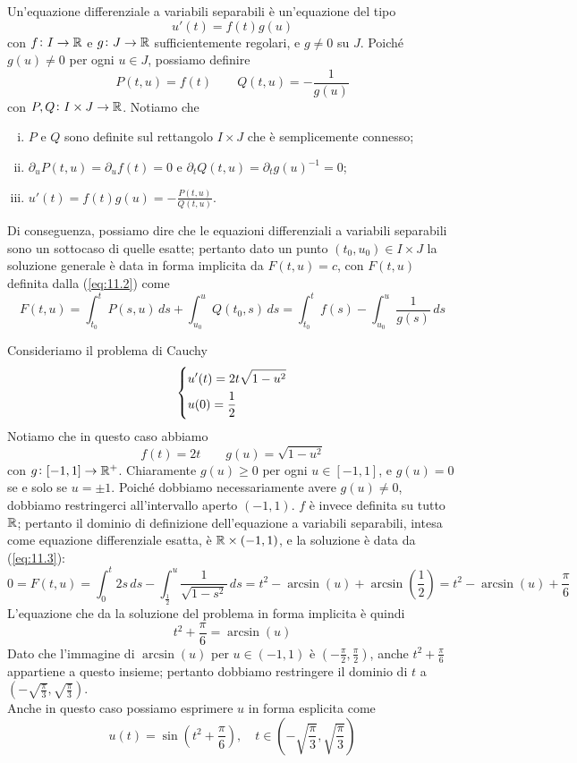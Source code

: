 \begin{definition}
    \label{def:11.6}
    Un'equazione differenziale a variabili separabili è un'equazione del tipo 
    \[
    u'(t) = f(t)g(u)
    \]
    con $f\colon I\to \amsbb{R}$ e $g\colon J \to \amsbb{R}$ sufficientemente regolari, e $g\ne 0$ su $J$. Poiché $g(u)\ne 0$ per ogni $u\in J$, possiamo definire
    \[
    P(t,u) = f(t) \qquad Q(t,u) = -\frac{1}{g(u)}
    \]
    con $P, Q \colon I \times J \to \amsbb{R}$. Notiamo che
    \begin{enumerate}[(i)]
        \item $P$ e $Q$ sono definite sul rettangolo $I \times J$ che è semplicemente connesso;
        \item $\partial_u P(t,u) = \partial_u f(t) = 0$ e $\partial_t Q(t,u) = \partial_t g(u)^{-1}=0$;
        \item $u'(t) = f(t)g(u) = -\frac{P(t,u)}{Q(t,u)}$.
    \end{enumerate}
    Di conseguenza, possiamo dire che le equazioni differenziali a variabili separabili sono un sottocaso di quelle esatte; pertanto dato un punto $(t_0, u_0)\in I\times J$ la soluzione generale è data in forma implicita da $F(t,u)=c$, con $F(t,u)$ definita dalla (\ref{eq:11.2}) come
    \begin{equation}
        \label{eq:11.3}
        F(t,u) = \int_{t_0}^t P(s,u)\, ds + \int_{u_0}^u Q(t_0, s)\, ds = \int_{t_0}^t f(s) - \int_{u_0}^u \frac{1}{g(s)}\, ds
    \end{equation}
\end{definition}
\begin{example}
    Consideriamo il problema di Cauchy
    \[
    \begin{dcases}
        u'(t)=2t\sqrt{1-u^2}\\
        u(0) = \frac{1}{2}
    \end{dcases}
    \]
    Notiamo che in questo caso abbiamo
    \[
    f(t) = 2t \qquad g(u) = \sqrt{1-u^2}
    \]
    con $g\colon[-1,1]\to \amsbb{R}^+$. Chiaramente $g(u)\ge 0$ per ogni $u\in[-1,1]$, e $g(u)=0$ se e solo se $u=\pm 1$. Poiché dobbiamo necessariamente avere $g(u)\ne 0$, dobbiamo restringerci all'intervallo aperto $(-1,1)$. $f$ è invece definita su tutto $\amsbb{R}$; pertanto il dominio di definizione dell'equazione a variabili separabili, intesa come equazione differenziale esatta, è $\amsbb{R}\times (-1,1)$, e la soluzione è data da (\ref{eq:11.3}):
    \[
    0=F(t,u) = \int_{0}^t 2s\, ds -\int_{\frac{1}{2}}^u\frac{1}{\sqrt{1-s^2}}\, ds = t^2 - \arcsin(u)+ \arcsin\left(\frac{1}{2}\right) = t^2-\arcsin(u)+\frac{\pi}{6}
    \]
    L'equazione che da la soluzione del problema in forma implicita è quindi
    \[
    t^2+\frac{\pi}{6}=\arcsin(u)
    \]
    Dato che l'immagine di $\arcsin(u)$ per $u\in(-1,1)$ è $\left(-\frac{\pi}{2}, \frac{\pi}{2}\right)$, anche $t^2+\frac{\pi}{6}$ appartiene a questo insieme; pertanto dobbiamo restringere il dominio di $t$ a $\left(-\sqrt{\frac{\pi}{3}}, \sqrt{\frac{\pi}{3}}\right)$. \\
    Anche in questo caso possiamo esprimere $u$ in forma esplicita come
    \[
    u(t)=\sin\left(t^2+\frac{\pi}{6}\right), \quad t\in\left(-\sqrt{\frac{\pi}{3}}, \sqrt{\frac{\pi}{3}}\right)
    \]
\end{example}
